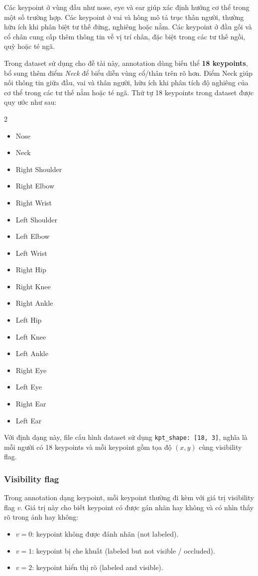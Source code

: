 \documentclass[12pt, a4paper]{article}
\begin{document}
Các keypoint ở vùng đầu như nose, eye và ear giúp xác định hướng cơ thể trong một số trường hợp.
Các keypoint ở vai và hông mô tả trục thân người, thường hữu ích khi phân biệt tư thế đứng, nghiêng hoặc nằm.
Các keypoint ở đầu gối và cổ chân cung cấp thêm thông tin về vị trí chân, đặc biệt trong các tư thế ngồi, quỳ hoặc té ngã.

Trong dataset sử dụng cho đề tài này, annotation dùng biến thể \textbf{18 keypoints}, bổ sung thêm điểm \textit{Neck} để biểu diễn vùng cổ/thân trên rõ hơn.
Điểm Neck giúp nối thông tin giữa đầu, vai và thân người, hữu ích khi phân tích độ nghiêng của cơ thể trong các tư thế nằm hoặc té ngã.
Thứ tự 18 keypoints trong dataset được quy ước như sau:

\begin{multicols}{2}
\begin{itemize}[nosep]
  \item[0.] Nose
  \item[1.] Neck
  \item[2.] Right Shoulder
  \item[3.] Right Elbow
  \item[4.] Right Wrist
  \item[5.] Left Shoulder
  \item[6.] Left Elbow
  \item[7.] Left Wrist
  \item[8.] Right Hip
  \item[9.] Right Knee
  \item[10.] Right Ankle
  \item[11.] Left Hip
  \item[12.] Left Knee
  \item[13.] Left Ankle
  \item[14.] Right Eye
  \item[15.] Left Eye
  \item[16.] Right Ear
  \item[17.] Left Ear
\end{itemize}
\end{multicols}

Với định dạng này, file cấu hình dataset sử dụng \texttt{kpt\_shape: [18, 3]}, nghĩa là mỗi người có 18 keypoints và mỗi keypoint gồm tọa độ $(x, y)$ cùng visibility flag.

\subsubsection{Visibility flag}
Trong annotation dạng keypoint, mỗi keypoint thường đi kèm với giá trị visibility flag $v$.
Giá trị này cho biết keypoint có được gán nhãn hay không và có nhìn thấy rõ trong ảnh hay không:
\begin{itemize}[nosep]
  \item $v = 0$: keypoint không được đánh nhãn (not labeled).
  \item $v = 1$: keypoint bị che khuất (labeled but not visible / occluded).
  \item $v = 2$: keypoint hiển thị rõ (labeled and visible).
\end{itemize}
\end{document}
